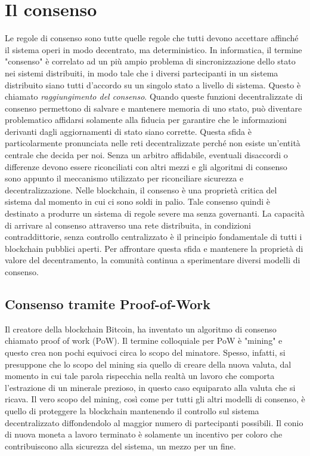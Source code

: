 \section{Il consenso}
Le regole di consenso sono tutte quelle regole che tutti devono accettare affinché il sistema operi in modo decentrato, ma deterministico. In informatica, il termine "consenso" è correlato ad un più ampio problema di sincronizzazione dello stato nei sistemi distribuiti, in modo tale che i diversi partecipanti in un sistema distribuito siano tutti d'accordo su un singolo stato a livello di sistema. Questo è chiamato \textit{raggiungimento del consenso}. Quando queste funzioni decentralizzate di consenso permettono di salvare e mantenere memoria di uno stato, può diventare problematico affidarsi solamente alla fiducia per garantire che le informazioni derivanti dagli aggiornamenti di stato siano corrette. Questa sfida è particolarmente pronunciata nelle reti decentralizzate perché non esiste un'entità centrale che decida per noi. Senza un arbitro affidabile, eventuali disaccordi o differenze devono essere riconciliati con altri mezzi e gli algoritmi di consenso sono appunto il meccanismo utilizzato per riconciliare sicurezza e decentralizzazione. Nelle blockchain, il consenso è una proprietà critica del sistema dal momento in cui ci sono soldi in palio. Tale consenso quindi è destinato a produrre un sistema di regole severe ma senza governanti. La capacità di arrivare al consenso attraverso una rete distribuita, in condizioni contraddittorie, senza controllo centralizzato è il principio fondamentale di tutti i blockchain pubblici aperti. Per affrontare questa sfida e mantenere la proprietà di valore del decentramento, la comunità continua a sperimentare diversi modelli di consenso.

\subsection{Consenso tramite Proof-of-Work}
Il creatore della blockchain Bitcoin, ha inventato un algoritmo di consenso chiamato proof of work (PoW). Il termine colloquiale per PoW è "mining" e questo crea non pochi equivoci circa lo scopo del minatore. Spesso, infatti, si presuppone che lo scopo del mining sia quello di creare della nuova valuta, dal momento in cui tale parola rispecchia nella realtà un lavoro che comporta l'estrazione di un minerale prezioso, in questo caso equiparato alla valuta che si ricava. Il vero scopo del mining, così come per tutti gli altri modelli di consenso, è quello di proteggere la blockchain mantenendo il controllo sul sistema decentralizzato diffondendolo al maggior numero di partecipanti possibili. Il conio di nuova moneta a lavoro terminato è solamente un incentivo per coloro che contribuiscono alla sicurezza del sistema, un mezzo per un fine.

